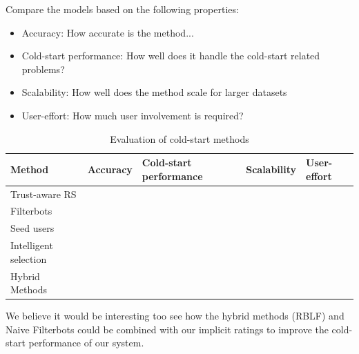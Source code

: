 Compare the models based on the following properties:

\begin{itemize}
    \item Accuracy: How accurate is the method...
    \item Cold-start performance: How well does it handle the cold-start related problems?
    \item Scalability: How well does the method scale for larger datasets
    \item User-effort: How much user involvement is required?
\end{itemize}

\begin{table}[H]
    \centering
    \begin{tabular}{|l|l|l|l|l|}
    \hline
    Method					& Accuracy & Cold-start performance & Scalability & User-effort \\ \hline
    Trust-aware RS 			& 		   & 						& \\ \hline
    Filterbots 				& 		   & 						& \\ \hline
    Seed users 				& 		   & 						& \\ \hline
    Intelligent selection 	& 		   & 						& \\ \hline
    Hybrid Methods 			& 		   & 						&	 \\ \hline
    \end{tabular}
    \caption[Evaluation of cold-start methods]{Evaluation of cold-start methods}
    \label{table:evaluationcoldstart}
\end{table}

We believe it would be interesting too see how the hybrid methods (RBLF) and Naive Filterbots could be
combined with our implicit ratings to improve the cold-start performance of our system.
